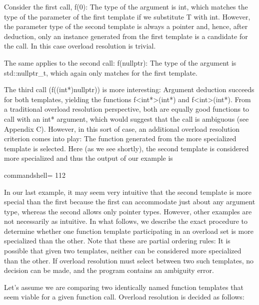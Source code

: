 Consider the first call, f(0): The type of the argument is int, which matches the type of the parameter of the first template if we substitute T with int. However, the parameter type of the second template is always a pointer and, hence, after deduction, only an instance generated from the first template is a candidate for the call. In this case overload resolution is trivial.

The same applies to the second call: f(nullptr): The type of the argument is std::nullptr\_t, which again only matches for the first template.

The third call (f((int*)nullptr)) is more interesting: Argument deduction succeeds for both templates, yielding the functions f<int*>(int*) and f<int>(int*). From a traditional overload resolution perspective, both are equally good functions to call with an int* argument, which would suggest that the call is ambiguous (see Appendix C). However, in this sort of case, an additional overload resolution criterion comes into play: The function generated from the more specialized template is selected. Here (as we see shortly), the second template is considered more specialized and thus the output of our example is

\begin{tcblisting}{commandshell={}}
112
\end{tcblisting}


In our last example, it may seem very intuitive that the second template is more special than the first because the first can accommodate just about any argument type, whereas the second allows only pointer types. However, other examples are not necessarily as intuitive. In what follows, we describe the exact procedure to determine whether one function template participating in an overload set is more specialized than the other. Note that these are partial ordering rules: It is possible that given two templates, neither can be considered more specialized than the other. If overload resolution must select between two such templates, no decision can be made, and the program contains an ambiguity error.

Let’s assume we are comparing two identically named function templates that seem viable for a given function call. Overload resolution is decided as follows:


